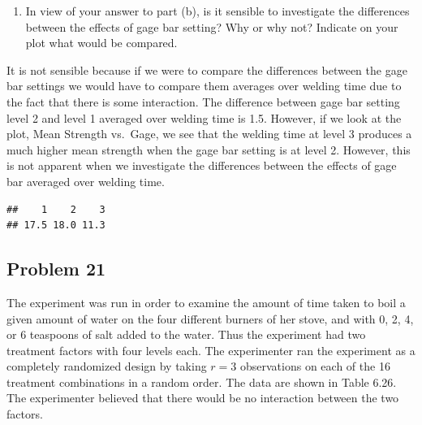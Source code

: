 \documentclass[12pt,]{article}
\newenvironment{Shaded}{\begin{snugshade}}{\end{snugshade}}
\newcommand{\KeywordTok}[1]{\textcolor[rgb]{0.13,0.29,0.53}{\textbf{#1}}}
\newcommand{\StringTok}[1]{\textcolor[rgb]{0.31,0.60,0.02}{#1}}
\newcommand{\OperatorTok}[1]{\textcolor[rgb]{0.81,0.36,0.00}{\textbf{#1}}}
\newcommand{\NormalTok}[1]{#1}
\providecommand{\tightlist}{%
  \setlength{\itemsep}{0pt}\setlength{\parskip}{0pt}}
\begin{document}
\begin{enumerate}
\def\labelenumi{(\alph{enumi})}
\setcounter{enumi}{2}
\tightlist
\item
  In view of your answer to part (b), is it sensible to investigate the
  differences between the effects of gage bar setting? Why or why not?
  Indicate on your plot what would be compared.
\end{enumerate}

It is not sensible because if we were to compare the differences between
the gage bar settings we would have to compare them averages over
welding time due to the fact that there is some interaction. The
difference between gage bar setting level 2 and level 1 averaged over
welding time is 1.5. However, if we look at the plot, Mean Strength
vs.~Gage, we see that the welding time at level 3 produces a much higher
mean strength when the gage bar setting is at level 2. However, this is
not apparent when we investigate the differences between the effects of
gage bar averaged over welding time.

\begin{Shaded}
\end{Shaded}

\begin{verbatim}
##    1    2    3 
## 17.5 18.0 11.3
\end{verbatim}

\subsection{Problem 21}\label{problem-21}

The experiment was run in order to examine the amount of time taken to
boil a given amount of water on the four different burners of her stove,
and with 0, 2, 4, or 6 teaspoons of salt added to the water. Thus the
experiment had two treatment factors with four levels each. The
experimenter ran the experiment as a completely randomized design by
taking \(r = 3\) observations on each of the 16 treatment combinations
in a random order. The data are shown in Table 6.26. The experimenter
believed that there would be no interaction between the two factors.
\end{document}

